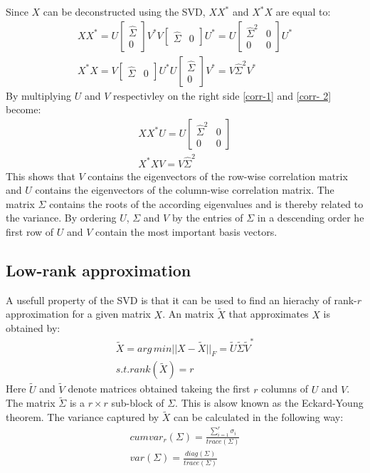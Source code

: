 Since \(X\) can be deconstructed using the SVD, \(XX^{*}\) and \(X^{*}X\) are equal to:
\begin{gather}
XX^{*} = U\begin{bmatrix}
\hat{\Sigma} \\
0
\end{bmatrix}V^{*}V\begin{bmatrix}
\hat{\Sigma} & 0
\end{bmatrix}U^{*} = U \begin{bmatrix}
\hat{\Sigma}^{2} & 0 \\
0 & 0
\end{bmatrix} U^{*} \label{corr-1}\\
X^{*}X = V \begin{bmatrix}
\hat{\Sigma} & 0
\end{bmatrix} U^{*}U \begin{bmatrix}
\hat{\Sigma} \\
0
\end{bmatrix} V^{*} = V\hat{\Sigma}^{2}V^{*} \label{corr- 2}
\end{gather}
By multiplying \(U\) and \(V\) respectivley on the right side \ref{corr-1} and \ref{corr- 2} become:
\begin{gather}
XX^{*}U = U \begin{bmatrix}
\hat{\Sigma}^{2} & 0 \\
0 & 0
\end{bmatrix} \\
X^{*}XV = V\hat{\Sigma}^{2}
\end{gather}
This shows that \(V\) contains the eigenvectors of the row-wise correlation matrix and \(U\) contains the eigenvectors of the column-wise correlation matrix.
The matrix \(\Sigma\) contains the roots of the according eigenvalues and is thereby related to the variance.
By ordering \(U\), \(\Sigma\) and \(V\) by the entries of \(\Sigma\) in a descending order he first row of \(U\) and \(V\) contain the most important basis vectors. \cite{brunton_kutz_2019b}

\subsection{Low-rank approximation}
A usefull property of the SVD is that it can be used to find an hierachy of rank-\(r\) approximation for a given matrix \(X\).
An matrix \(\tilde{X}\) that approximates \(X\) is obtained by:
\begin{gather}
\tilde{X} = arg\,min ||X - \tilde{X}||_F = \tilde{U}\tilde{\Sigma}\tilde{V}^{*}	\\
s.t. rank(\tilde{X}) = r
\end{gather}	
Here  \(\tilde{U}\) and \(\tilde{V}\) denote matrices obtained takeing the first \(r\) columns of \(U\) and \(V\). The matrix \(\tilde{\Sigma}\) is a \(r \times r\) sub-block of \(\Sigma\).
This is alsow known as the Eckard-Young theorem.
The variance captured by \(\tilde{X}\) can be calculated in the following way:
\begin{gather}
cumvar_{r}(\Sigma) = \frac{\sum_{i = 1}^{r} \sigma_i}{trace(\Sigma)} \label{cum-var-r} \\
var(\Sigma) = \frac{diag(\Sigma)}{trace(\Sigma)} \label{var-sig}
\end{gather}
\cite{brunton_kutz_2019b}
